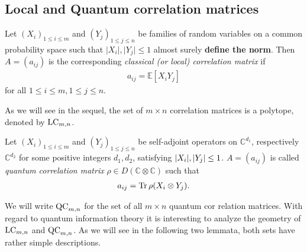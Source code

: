 \subsection{Local and Quantum correlation matrices}
\begin{dfn}
	Let $ (X_i)_{1 \le i \le m } $ and $ (Y_j)_{1 \le j \le n} $ be families of random variables on a common probability space such that $ \vert X_i \vert, \vert Y_j \vert \le 1 $ almost surely \textbf{define the norm}. Then $ A=(a_{ij}) $ is the corresponding {\itshape classical (or local) correlation matrix} if 
	\begin{align*}
		a_{ij} = \mathbb{E}[X_iY_j]
	\end{align*}
	for all $ 1 \le i \le m, 1 \le j \le n $.
\end{dfn}
As we will see in the sequel, the set of $ m \times n $ correlation matrices is a polytope, denoted by $ \textup{LC}_{m,n} $.

\begin{dfn}
	Let $ (X_i)_{1 \le i \le m } $ and $ (Y_j)_{1 \le j \le n} $ be self-adjoint operators on $ \mathbb{C}^{d_1} $, respectively $ \mathbb{C}^{d_2} $ for some positive integers $ d_1,d_2 $, satisfying $ {\left|{X_i}\right|}, {\left|{Y_j}\right|} \le 1 $. $ A = (a_{ij}) $ is called {\itshape quantum correlation matrix} $ \rho \in D(\mathbb{C} \otimes \mathbb{C})$ such that 
	\begin{align*}
		a_{ij} = \text{Tr} \, {\rho (X_i \otimes Y_j)} .
	\end{align*}
\end{dfn}
We will write $ \textup{QC}_{m,n} $ for the set of all $ m \times n $ quantum cor relation matrices.
With regard to quantum information theory it is interesting to analyze the geometry of $ \textup{LC}_{m,n} $ and $ \textup{QC}_{m,n} $. As we will see in the following two lemmata, both sets have rather simple descriptions. 


